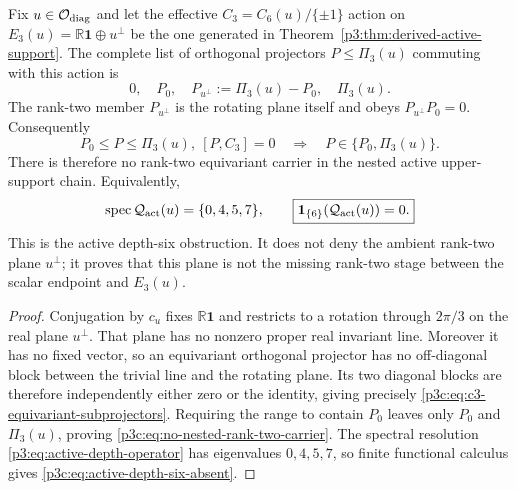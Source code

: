 \documentclass[12pt,a4paper]{article}
\begin{document}
\begin{theorem}
\label{p3c:thm:active-depth-six-obstruction}
Fix \(u\in\mathcal O_{\rm diag}\) and let the effective
\(C_3=C_6(u)/\{\pm1\}\) action on
\(E_3(u)=\mathbb R\mathbf1\oplus u^\perp\) be the one generated in
Theorem~\ref{p3:thm:derived-active-support}.  The complete list of orthogonal
projectors \(P\le\Pi_3(u)\) commuting with this action is
\begin{equation}
 \label{p3c:eq:c3-equivariant-subprojectors}
 \boxed{0,\quad P_0,\quad
 P_{u^\perp}:=\Pi_3(u)-P_0,\quad\Pi_3(u).}
\end{equation}
The rank-two member \(P_{u^\perp}\) is the rotating plane itself and obeys
\(P_{u^\perp}P_0=0\).  Consequently
\begin{equation}
 \label{p3c:eq:no-nested-rank-two-carrier}
 \boxed{P_0\le P\le\Pi_3(u),\ [P,C_3]=0
 \quad\Longrightarrow\quad P\in\{P_0,\Pi_3(u)\}.}
\end{equation}
There is therefore no rank-two equivariant carrier in the nested active
upper-support chain.  Equivalently,
\begin{equation}
 \label{p3c:eq:active-depth-six-absent}
 \operatorname{spec}\mathcal Q_{\rm act}(u)=\{0,4,5,7\},
 \qquad
 \boxed{\mathbf1_{\{6\}}(\mathcal Q_{\rm act}(u))=0.}
\end{equation}
This is the active depth-six obstruction.  It does not deny the ambient
rank-two plane \(u^\perp\); it proves that this plane is not the missing
rank-two stage between the scalar endpoint and \(E_3(u)\).
\end{theorem}

\begin{proof}
Conjugation by \(c_u\) fixes \(\mathbb R\mathbf1\) and restricts to a
rotation through \(2\pi/3\) on the real plane \(u^\perp\).  That plane has no
nonzero proper real invariant line.  Moreover it has no fixed vector, so an
equivariant orthogonal projector has no off-diagonal block between the
trivial line and the rotating plane.  Its two diagonal blocks are therefore
independently either zero or the identity, giving precisely
\eqref{p3c:eq:c3-equivariant-subprojectors}.  Requiring the range to contain
\(P_0\) leaves only \(P_0\) and \(\Pi_3(u)\), proving
\eqref{p3c:eq:no-nested-rank-two-carrier}.  The spectral resolution
\eqref{p3:eq:active-depth-operator} has eigenvalues \(0,4,5,7\), so finite
functional calculus gives \eqref{p3c:eq:active-depth-six-absent}.
\end{proof}
\end{document}
